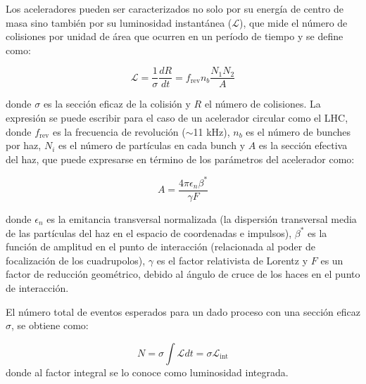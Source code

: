 Los aceleradores pueden ser caracterizados no solo por su energía de centro de masa sino también por su luminosidad instantánea ($\mathcal{L}$), que mide el número de colisiones por unidad de área que ocurren en un período de tiempo y se define como: 

\begin{equation}
\mathcal{L}= \frac{1}{\sigma}\frac{dR}{dt} = f_{\text{rev}}n_{b}\frac{N_{1}N_{2}}{A}
\end{equation}

\noindent
donde $\sigma$ es la sección eficaz de la colisión y $R$ el número de colisiones. La expresión se puede escribir para el caso de un acelerador circular como el LHC, donde $f_{\text{rev}}$ es la frecuencia de revolución ($\sim$11 kHz), $n_{b}$ es el número de bunches por haz, $N_{i}$ es el número de partículas en cada bunch y $A$ es la sección efectiva del haz, que puede expresarse en término de los parámetros del acelerador como:

\begin{equation}
A=\frac{4 \pi \epsilon_{n}\beta^{*}}{\gamma F}
\end{equation} 

\noindent
donde $\epsilon_{n}$ es la emitancia transversal normalizada (la dispersión transversal media de las partículas del  haz en el espacio de coordenadas e impulsos), $\beta^{*}$ es la función de amplitud en el punto de interacción (relacionada al poder de focalización de los cuadrupolos), $\gamma$ es el factor relativista de Lorentz y $F$ es un factor de reducción geométrico, debido al ángulo de cruce de los haces en el punto de interacción.

El número total de eventos esperados para un dado proceso con una sección eficaz $\sigma$, se obtiene como:

\begin{equation}
N=\sigma \int \mathcal{L} dt = \sigma \mathcal{L}_{\text{int}}
\end{equation}	
%
donde al factor integral se lo conoce como luminosidad integrada.

